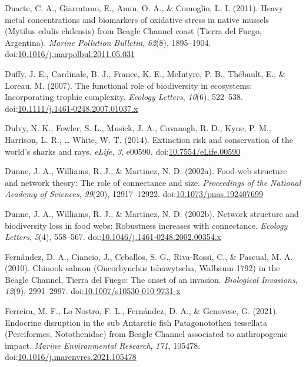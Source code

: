 \documentclass[
]{article}
\newlength{\cslhangindent}
\newlength{\cslentryspacingunit} %
\newenvironment{CSLReferences}[2] %
 {%
  \setlength{\parindent}{0pt}
  \ifodd #1
  \let\oldpar\par
  \def\par{\hangindent=\cslhangindent\oldpar}
  \fi
  \setlength{\parskip}{#2\cslentryspacingunit}
 }%
 {}
\begin{document}
\begin{CSLReferences}{1}{0}
\leavevmode{}%
Duarte, C. A., Giarratano, E., Amin, O. A., \& Comoglio, L. I. (2011).
Heavy metal concentrations and biomarkers of oxidative stress in native
mussels ({Mytilus} edulis chilensis) from {Beagle Channel} coast
({Tierra} del {Fuego}, {Argentina}). \emph{Marine Pollution Bulletin},
\emph{62}(8), 1895--1904.
doi:\href{https://doi.org/10.1016/j.marpolbul.2011.05.031}{10.1016/j.marpolbul.2011.05.031}

\leavevmode{}%
Duffy, J. E., Cardinale, B. J., France, K. E., McIntyre, P. B.,
Thébault, E., \& Loreau, M. (2007). The functional role of biodiversity
in ecosystems: Incorporating trophic complexity. \emph{Ecology Letters},
\emph{10}(6), 522--538.
doi:\href{https://doi.org/10.1111/j.1461-0248.2007.01037.x}{10.1111/j.1461-0248.2007.01037.x}

\leavevmode{}%
Dulvy, N. K., Fowler, S. L., Musick, J. A., Cavanagh, R. D., Kyne, P.
M., Harrison, L. R., \ldots{} White, W. T. (2014). Extinction risk and
conservation of the world's sharks and rays. \emph{eLife}, \emph{3},
e00590.
doi:\href{https://doi.org/10.7554/eLife.00590}{10.7554/eLife.00590}

\leavevmode{}%
Dunne, J. A., Williams, R. J., \& Martinez, N. D. (2002a). Food-web
structure and network theory: {The} role of connectance and size.
\emph{Proceedings of the National Academy of Sciences}, \emph{99}(20),
12917--12922.
doi:\href{https://doi.org/10.1073/pnas.192407699}{10.1073/pnas.192407699}

\leavevmode{}%
Dunne, J. A., Williams, R. J., \& Martinez, N. D. (2002b). Network
structure and biodiversity loss in food webs: Robustness increases with
connectance. \emph{Ecology Letters}, \emph{5}(4), 558--567.
doi:\href{https://doi.org/10.1046/j.1461-0248.2002.00354.x}{10.1046/j.1461-0248.2002.00354.x}

\leavevmode{}%
Fernández, D. A., Ciancio, J., Ceballos, S. G., Riva-Rossi, C., \&
Pascual, M. A. (2010). Chinook salmon ({Oncorhynchus} tshawytscha,
{Walbaum} 1792) in the {Beagle Channel}, {Tierra} del {Fuego}: The onset
of an invasion. \emph{Biological Invasions}, \emph{12}(9), 2991--2997.
doi:\href{https://doi.org/10.1007/s10530-010-9731-x}{10.1007/s10530-010-9731-x}

\leavevmode{}%
Ferreira, M. F., Lo Nostro, F. L., Fernández, D. A., \& Genovese, G.
(2021). Endocrine disruption in the sub {Antarctic} fish
{Patagonotothen} tessellata ({Perciformes}, {Notothenidae}) from {Beagle
Channel} associated to anthropogenic impact. \emph{Marine Environmental
Research}, \emph{171}, 105478.
doi:\href{https://doi.org/10.1016/j.marenvres.2021.105478}{10.1016/j.marenvres.2021.105478}


\end{CSLReferences}
\end{document}
